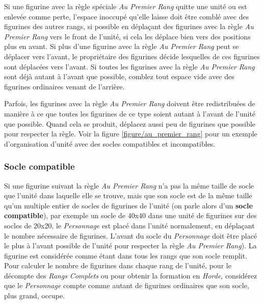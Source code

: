 Si une figurine avec la règle spéciale \emph{Au Premier Rang} quitte une unité ou est enlevée comme perte, l'espace inoccupé qu'elle laisse doit être comblé avec des figurines des autres rangs, si possible en déplaçant des figurines avec la règle \emph{Au Premier Rang} vers le front de l'unité, si cela les déplace bien vers des positions plus en avant. Si plus d'une figurine avec la règle \emph{Au Premier Rang} peut se déplacer vers l'avant, le propriétaire des figurines décide lesquelles de ces figurines sont déplacées vers l'avant. Si toutes les figurines avec la règle \emph{Au Premier Rang} sont déjà autant à l'avant que possible, comblez tout espace vide avec des figurines ordinaires venant de l'arrière.

Parfois, les figurines avec la règle \emph{Au Premier Rang} doivent être redistribuées de manière à ce que toutes les figurines de ce type soient autant à l'avant de l'unité que possible. Quand cela se produit, déplacez aussi peu de figurines que possible pour respecter la règle. Voir la figure \ref{figure/au_premier_rang} pour un exemple d'organisation d'unité avec des socles compatibles et incompatibles.

\subsubsection*{Socle compatible}
Si une figurine suivant la règle \emph{Au Premier Rang} n'a pas la même taille de socle que l'unité dans laquelle elle se trouve, mais que son socle est de la même taille qu'un multiple entier de socles de figurines de l'unité (on parle alors d'un \textbf{socle compatible}), par exemple un socle de $ 40 $x\unit{40}{\milli\meter} dans une unité de figurines sur des socles de $ 20 $x\unit{20}{\milli\meter}, le \emph{Personnage} est placé dans l'unité normalement, en déplaçant le nombre nécessaire de figurines. L'avant du socle du \emph{Personnage} doit être placé le plus à l'avant possible de l'unité pour respecter la règle \emph{Au Premier Rang}). La figurine est considérée comme étant dans tous les rangs que son socle remplit. Pour calculer le nombre de figurines dans chaque rang de l'unité, pour le décompte des \emph{Rangs Complets} ou pour obtenir la formation en \emph{Horde}, considérez que le \emph{Personnage} compte comme autant de figurines ordinaires que son socle, plus grand, occupe.

